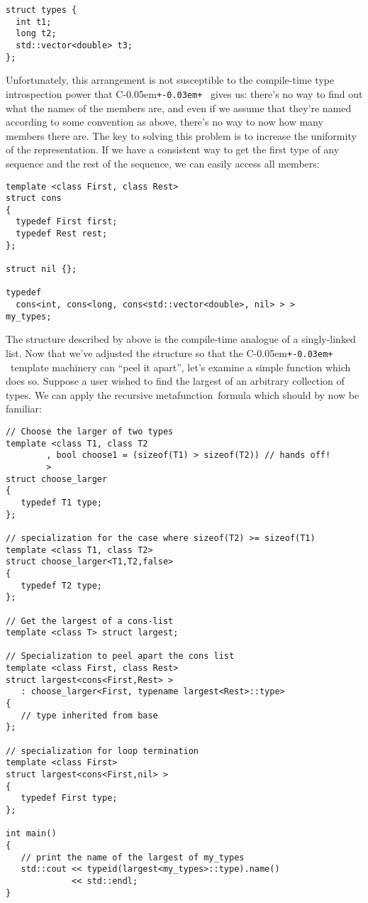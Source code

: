 \documentclass{kapproc}
\newcommand{\Cpp}{C\kern-0.05em\texttt{+\kern-0.03em+}%
}
\newcommand{\mfn}{meta\-func\-tion}
\begin{document}
{\small
\begin{codesamp}\begin{verbatim}
struct types {
  int t1;
  long t2;
  std::vector<double> t3;
};
\end{verbatim}
\end{codesamp}
}

Unfortunately, this arrangement is not susceptible to the compile-time
type introspection power that \Cpp\ gives us: there's no way to find
out what the names of the members are, and even if we assume that
they're named according to some convention as above, there's no way to
now how many members there are. The key to solving this problem is to
increase the uniformity of the representation. If we have a consistent
way to get the first type of any sequence and the rest of the
sequence, we can easily access all members:

{\small
\begin{codesamp}\begin{verbatim}
template <class First, class Rest>
struct cons
{
  typedef First first;
  typedef Rest rest;
};

struct nil {};

typedef
  cons<int, cons<long, cons<std::vector<double>, nil> > >
my_types;
\end{verbatim}
\end{codesamp}
}

The structure described by  above is the compile-time
analogue of a singly-linked list. Now that we've adjusted the
structure so that the \Cpp\ template machinery can ``peel it apart'',
let's examine a simple function which does so. Suppose a user wished
to find the largest of an arbitrary collection of types. We can apply
the recursive \mfn\ formula which should by now be familiar:

{\small
\begin{codesamp}\begin{verbatim}
// Choose the larger of two types
template <class T1, class T2
        , bool choose1 = (sizeof(T1) > sizeof(T2)) // hands off!
        >
struct choose_larger
{
   typedef T1 type;
};

// specialization for the case where sizeof(T2) >= sizeof(T1)
template <class T1, class T2>
struct choose_larger<T1,T2,false>
{
   typedef T2 type;
};

// Get the largest of a cons-list
template <class T> struct largest;

// Specialization to peel apart the cons list
template <class First, class Rest>
struct largest<cons<First,Rest> >
   : choose_larger<First, typename largest<Rest>::type>
{
   // type inherited from base
};

// specialization for loop termination
template <class First>
struct largest<cons<First,nil> >
{
   typedef First type;
};

int main()
{
   // print the name of the largest of my_types
   std::cout << typeid(largest<my_types>::type).name()
             << std::endl;
}

\end{verbatim}
\end{codesamp}
}
\end{document}
